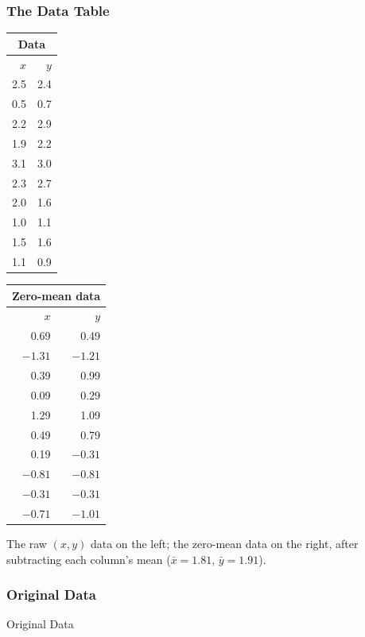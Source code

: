 \begin{frame}[fragile] \frametitle{The Data Table}
\begin{center}
\begin{tabular}{rr}
\multicolumn{2}{c}{\textbf{Data}} \\
\hline
$x$ & $y$ \\
\hline
2.5 & 2.4 \\
0.5 & 0.7 \\
2.2 & 2.9 \\
1.9 & 2.2 \\
3.1 & 3.0 \\
2.3 & 2.7 \\
2.0 & 1.6 \\
1.0 & 1.1 \\
1.5 & 1.6 \\
1.1 & 0.9 \\
\hline
\end{tabular}
\hspace{3em}
\begin{tabular}{rr}
\multicolumn{2}{c}{\textbf{Zero-mean data}} \\
\hline
$x$ & $y$ \\
\hline
0.69 & 0.49 \\
$-1.31$ & $-1.21$ \\
0.39 & 0.99 \\
0.09 & 0.29 \\
1.29 & 1.09 \\
0.49 & 0.79 \\
0.19 & $-0.31$ \\
$-0.81$ & $-0.81$ \\
$-0.31$ & $-0.31$ \\
$-0.71$ & $-1.01$ \\
\hline
\end{tabular}
\end{center}
The raw $(x,y)$ data on the left; the zero-mean data on the right, after subtracting each
column's mean ($\bar{x} = 1.81$, $\bar{y} = 1.91$).
\end{frame}

\begin{frame}[fragile] \frametitle{Original Data}
Original Data
\begin{center}
\end{center}
\end{frame}


